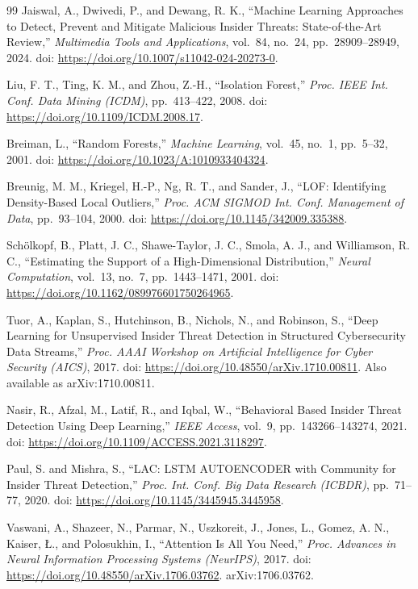 \documentclass[11pt,a4paper,oneside]{report}
\theoremstyle{definition}
\theoremstyle{plain}
\begin{document}
\begin{thebibliography}{99}
Jaiswal, A., Dwivedi, P., and Dewang, R. K., ``Machine Learning Approaches to Detect, Prevent and Mitigate Malicious Insider Threats: State-of-the-Art Review,'' \emph{Multimedia Tools and Applications}, vol.~84, no.~24, pp.~28909--28949, 2024. doi: \url{https://doi.org/10.1007/s11042-024-20273-0}.

Liu, F. T., Ting, K. M., and Zhou, Z.-H., ``Isolation Forest,'' \emph{Proc. IEEE Int. Conf. Data Mining ({ICDM})}, pp.~413--422, 2008. doi: \url{https://doi.org/10.1109/ICDM.2008.17}.

Breiman, L., ``Random Forests,'' \emph{Machine Learning}, vol.~45, no.~1, pp.~5--32, 2001. doi: \url{https://doi.org/10.1023/A:1010933404324}.

Breunig, M. M., Kriegel, H.-P., Ng, R. T., and Sander, J., ``{LOF}: Identifying Density-Based Local Outliers,'' \emph{Proc. {ACM} {SIGMOD} Int. Conf. Management of Data}, pp.~93--104, 2000. doi: \url{https://doi.org/10.1145/342009.335388}.

Sch{\"o}lkopf, B., Platt, J. C., Shawe-Taylor, J. C., Smola, A. J., and Williamson, R. C., ``Estimating the Support of a High-Dimensional Distribution,'' \emph{Neural Computation}, vol.~13, no.~7, pp.~1443--1471, 2001. doi: \url{https://doi.org/10.1162/089976601750264965}.

Tuor, A., Kaplan, S., Hutchinson, B., Nichols, N., and Robinson, S., ``Deep Learning for Unsupervised Insider Threat Detection in Structured Cybersecurity Data Streams,'' \emph{Proc. {AAAI} Workshop on Artificial Intelligence for Cyber Security ({AICS})}, 2017. doi: \url{https://doi.org/10.48550/arXiv.1710.00811}. Also available as arXiv:1710.00811.

Nasir, R., Afzal, M., Latif, R., and Iqbal, W., ``Behavioral Based Insider Threat Detection Using Deep Learning,'' \emph{IEEE Access}, vol.~9, pp.~143266--143274, 2021. doi: \url{https://doi.org/10.1109/ACCESS.2021.3118297}.

Paul, S. and Mishra, S., ``{LAC}: {LSTM} {AUTOENCODER} with Community for Insider Threat Detection,'' \emph{Proc. Int. Conf. Big Data Research ({ICBDR})}, pp.~71--77, 2020. doi: \url{https://doi.org/10.1145/3445945.3445958}.

Vaswani, A., Shazeer, N., Parmar, N., Uszkoreit, J., Jones, L., Gomez, A. N., Kaiser, {\L}., and Polosukhin, I., ``Attention Is All You Need,'' \emph{Proc. Advances in Neural Information Processing Systems ({NeurIPS})}, 2017. doi: \url{https://doi.org/10.48550/arXiv.1706.03762}. arXiv:1706.03762.


\end{thebibliography}
\end{document}
